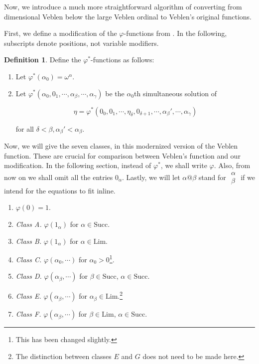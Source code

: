 \documentclass{article}
\theoremstyle{definition}
\newtheorem{definition}{Definition}[section]
\theoremstyle{plain}
\theoremstyle{plain}
\theoremstyle{plain}
\theoremstyle{plain}
\theoremstyle{remark}
\theoremstyle{remark}
\theoremstyle{remark}
\theoremstyle{plain}
\theoremstyle{plain}
\begin{document}
Now, we introduce a much more straightforward algorithm of converting from dimensional Veblen below the large Veblen ordinal to Veblen's original functions.

First, we define a modification of the $\varphi$-functions from \cite{veblen}. In the following, subscripts denote positions, not variable modifiers.

\begin{definition}
Define the $\varphi^*$-functions as follows:
\begin{enumerate}
    \item Let $\varphi^*(\alpha_0) = \omega^\alpha$.
    \item Let $\varphi^*(\alpha_0,0_1, \cdots,\alpha_\beta, \cdots,\alpha_\gamma)$ be the $\alpha_0$th simultaneous solution of
    
    \begin{equation}
    \eta = \varphi^*(0_0,0_1, \cdots,\eta_\delta,0_{\delta+1}, \cdots,\alpha_\beta ', \cdots,\alpha_\gamma)
    \end{equation}
    
    for all $\delta < \beta, \alpha_\beta' < \alpha_\beta$.
\end{enumerate}
\end{definition}

Now, we will give the seven classes, in this modernized version of the Veblen function. These are crucial for comparison between Veblen's function and our modification. In the following section, instead of $\varphi^*$, we shall write $\varphi$. Also, from now on we shall omit all the entries $0_\alpha$. Lastly, we will let $\alpha@\beta$ stand for $\begin{matrix}\alpha\\\beta\end{matrix}$ if we intend for the equations to fit inline.

\begin{enumerate}
    \addtocounter{enumi}{-1}
    \item $\varphi(0) = 1$.
    \item \textit{Class A.} $\varphi(1_\alpha)$ for $\alpha \in \mathrm{Succ}$.
    \item \textit{Class B.} $\varphi(1_\alpha)$ for $\alpha \in \mathrm{Lim}$.
    \item \textit{Class C.} $\varphi(\alpha_0, \cdots)$ for $\alpha_0 > 0$\footnote{This has been changed slightly.}.
    \item \textit{Class D.} $\varphi(\alpha_\beta, \cdots)$ for $\beta \in \mathrm{Succ}$, $\alpha \in \mathrm{Succ}$.
    \item \textit{Class E.} $\varphi(\alpha_\beta, \cdots)$ for $\alpha_\beta \in \mathrm{Lim}$.\footnote{The distinction between classes $E$ and $G$ does not need to be made here.}
    \item \textit{Class F.} $\varphi(\alpha_\beta, \cdots)$ for $\beta \in \mathrm{Lim}$, $\alpha \in \mathrm{Succ}$.
\end{enumerate}
\end{document}
